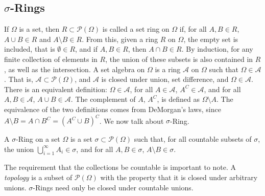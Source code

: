             \subsection{\texorpdfstring{$\sigma$}{Sigma}-Rings}
                If $\Omega$ is a set, then $R\subset\mathcal{P}(\Omega)$
                is called a set ring on $\Omega$ if, for all
                $A,B\in{R}$, $A\cup{B}\in{R}$ and
                $A\setminus{B}\in{R}$. From this, given a ring $R$ on
                $\Omega$, the empty set is included, that is
                $\emptyset\in{R}$, and if $A,B\in{R}$, then
                $A\cap{B}\in{R}$. By induction, for any finite collection
                of elements in $R$, the union of these subsets is also
                contained in $R$, as well as the intersection. A set
                algebra on $\Omega$ is a ring $\mathcal{A}$
                on $\Omega$ such that $\Omega\in\mathcal{A}$. That is,
                $\mathcal{A}\subset\mathcal{P}(\Omega)$, and
                $\mathcal{A}$ is closed under union, set difference, and
                $\Omega\in\mathcal{A}$. There is an equivalent definition:
                $\Omega\in\mathcal{A}$, for all $A\in\mathcal{A}$,
                $A^{C}\in\mathcal{A}$, and for all $A,B\in\mathcal{A}$,
                $A\cup{B}\in\mathcal{A}$. The complement of $A$,
                $A^{C}$, is defined as $\Omega\setminus{A}$. The
                equivalence of the two definitions comes from DeMorgan's
                laws, since
                $A\setminus{B}=A\cap{B}^{C}=(A^{C}\cup{B})^{C}$. We now
                talk about $\sigma$-Ring.
                \begin{definition}
                    A $\sigma$-Ring on a set $\Omega$ is a set
                    $\sigma\subset\mathcal{P}(\Omega)$ such that,
                    for all countable subsets of $\sigma$, the union
                    $\bigcup_{i=1}^{\infty}A_{i}\in\sigma$, and for all
                    $A,B\in\sigma$, $A\setminus{B}\in\sigma$.
                \end{definition}
                The requirement that the collections be countable is
                important to note. A \textit{topology} is a subset
                of $\mathcal{P}(\Omega)$ with the property that it is
                closed under arbitrary unions. $\sigma$-Rings need only
                be closed under countable unions.
